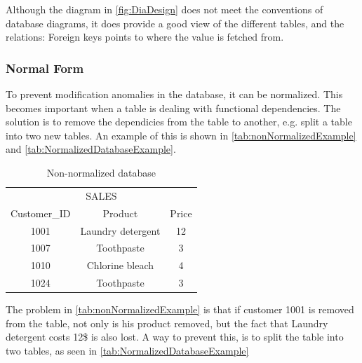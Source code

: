 Although the diagram in \autoref{fig:DiaDesign} does not meet the conventions of database diagrams, it does provide a good view of the different tables, and the relations: Foreign keys points to where the value is fetched from.

\subsubsection{Normal Form}
To prevent modification anomalies in the database, it can be normalized. This becomes important when a table is dealing with functional dependencies. The solution is to remove the dependicies from the table to another, e.g. split a table into two new tables. An example of this is shown in \autoref{tab:nonNormalizedExample} and \autoref{tab:NormalizedDatabaseExample}.

\begin{table}[htbp]
	\centering
		\begin{tabular}{|c|c|c|}
		\hline
		 \multicolumn{3}{|c|}{SALES}\\
		\multicolumn{1}{|c}{Customer\_ID} & \multicolumn{1}{c}{Product} & \multicolumn{1}{c|}{Price} \\
		\hline
		1001 & Laundry detergent & 12 \\ \hline
		1007 & Toothpaste & 3 \\ \hline
		1010 & Chlorine bleach & 4 \\ \hline
		1024 & Toothpaste & 3\\	\hline
		\end{tabular}
	\caption{Non-normalized database\cite[p. 114]{sqlForDummies}}
	\label{tab:nonNormalizedExample}
\end{table}

The problem in \autoref{tab:nonNormalizedExample} is that if customer 1001 is removed from the table, not only is his product removed, but the fact that Laundry detergent costs 12\$ is also lost. A way to prevent this, is to split the table into two tables, as seen in \autoref{tab:NormalizedDatabaseExample}

